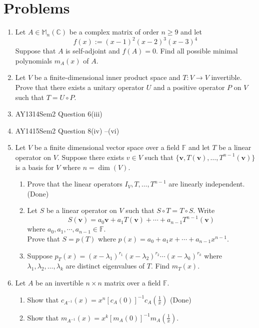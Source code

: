\documentclass[12pt]{article}
\theoremstyle{definition}
\begin{document}
\section{Problems}
\begin{enumerate}[label = \arabic*]
\item Let $A\in\mathbb{M}_n(\mathbb{C})$ be a complex matrix of order $n\geq 9$ and let
\[
f(x):=(x-1)^2(x-2)^3(x-3)^4
\]
Suppose that $A$ is self-adjoint and $f(A)=0$. Find all possible minimal polynomials $m_A(x)$ of $A$.
\item  Let $V$ be a finite-dimensional inner product space and $T:V\to V$ invertible. Prove that there exists a unitary operator $U$ and a positive operator $P$ on $V$ such that $T=U\circ P$.
\item AY1314Sem2 Question 6(iii)
\item AY1415Sem2 Question 8(iv) --(vi)
\item Let $V$ be a finite dimensional vector space over a field $\mathbb{F}$ and let $T$ be a linear operator on $V$. Suppose there exists $v\in V$ such that $\{\mathbf{v}, T(\mathbf{v}),\ldots, T^{n-1}(\mathbf{v})\}$ is a basis for $V$ where $n=\dim(V)$.
\begin{enumerate}
\item Prove that the linear operators $I_V, T,\ldots, T^{n-1}$ are linearly independent. (Done)
\item Let $S$ be a linear operator on $V$ such that $S\circ T = T\circ S$. Write
\[
S(\mathbf{v})=a_0\mathbf{v}+a_1T(\mathbf{v})+\cdots+a_{n-1}T^{n-1}(\mathbf{v})
\]
where $a_0,a_1,\cdots, a_{n-1}\in\mathbb{F}$.\\
Prove that $S=p(T)$ where $p(x) = a_0+a_1x+\cdots+a_{n-1}x^{n-1}$.
\item Suppose $p_T(x)=(x-\lambda_1)^{r_1}(x-\lambda_2)^{r_2}\cdots (x-\lambda_k)^{r_k}$ where $\lambda_1,\lambda_2,\ldots, \lambda_k$ are distinct eigenvalues of $T$. Find $m_T(x)$.
\end{enumerate}
\item Let $A$ be an invertible $n\times n$ matrix over a field $\mathbb{F}$.
\begin{enumerate}
\item Show that $c_{A^{-1}}(x)=x^n[c_A(0)]^{-1}c_A(\frac{1}{x})$ (Done)
\item Show that $m_{A^{-1}}(x)=x^k[m_A(0)]^{-1}m_A(\frac{1}{x})$.
\end{enumerate}
\end{enumerate}
\end{document}
